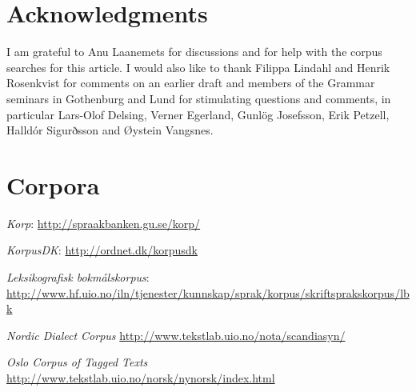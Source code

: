 \documentclass[output=paper]{LSP/langsci}
\begin{document}
\section*{Acknowledgments}

I am grateful to Anu Laanemets for discussions and for help with the corpus searches for this article. I would also like to thank Filippa Lindahl and Henrik Rosenkvist for comments on an earlier draft and members of the Grammar seminars in Gothenburg and Lund for stimulating questions and comments, in particular Lars-Olof Delsing, Verner Egerland, Gunlög Josefsson, Erik Petzell, Halldór Sigurðsson and Øystein Vangsnes.

 
\section*{Corpora}

\textit{Korp}: \url{http://spraakbanken.gu.se/korp/}

\noindent
\textit{KorpusDK}: \url{http://ordnet.dk/korpusdk}

\noindent
\textit{Leksikografisk bokmålskorpus}:     \url{http://www.hf.uio.no/iln/tjenester/kunnskap/sprak/korpus/skriftsprakskorpus/lbk}

\noindent
\textit{Nordic Dialect Corpus} 
\url{http://www.tekstlab.uio.no/nota/scandiasyn/}

\noindent
\textit{Oslo Corpus of Tagged  Texts}   
\url{http://www.tekstlab.uio.no/norsk/nynorsk/index.html}


\newpage 
\largerpage
\sloppy
\printbibliography[heading=subbibliography,notkeyword=this]
\end{document}
